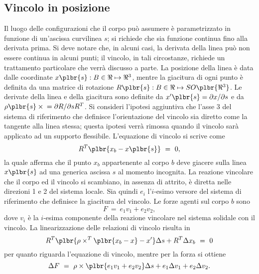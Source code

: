 \documentclass[12pt,dvips,fleqn,italian]{article}
\begin{document}
\subsection*{Vincolo in posizione}
Il luogo delle configurazioni che il corpo pu\`{o} assumere \`{e}
parametrizzato in funzione di un'ascissa curvilinea $ s $; 
si richiede che sia funzione continua fino alla derivata prima.
Si deve notare che, in alcuni casi, la derivata della linea pu\`o 
non essere continua in alcuni punti; il vincolo, in tali circostanze, 
richiede un trattamento particolare che verr\`a discusso a parte.
La posizione della linea \`{e} data dalle coordinate 
$ x\plbr{s}:B\in\Re\mapsto\Re^3 $,
mentre la giacitura di ogni punto \`{e} definita da una matrice di rotazione
$ R\plbr{s}:B\in\Re\mapsto{SO\plbr{\Re^3}} $.
Le derivate della linea e della giacitura sono definite da
$ x'\plbr{s}=\partial{x}/\partial{s} $ e da
$ \rho\plbr{s}\times{}=\partial{R}/\partial{s}R^T $.
Si consideri l'ipotesi aggiuntiva che l'asse 3 del sistema di riferimento
che definisce l'orientazione del vincolo sia diretto come la tangente alla
linea stessa; questa ipotesi verr\`a rimossa quando il vincolo sar\`a
applicato ad un supporto flessibile.
L'equazione di vincolo si scrive come
\begin{displaymath}
    R^T \plbr{ x_b - x\plbr{s} } \ = \ 0 ,
\end{displaymath}
la quale afferma che il punto $ x_b $ appartenente al corpo $ b $ deve
giacere sulla linea $ x\plbr{s} $ ad una generica ascissa $ s $ al momento
incognita.
La reazione vincolare che il corpo ed il vincolo si scambiano, in assenza di
attrito, \`{e} diretta nelle direzioni 1 e 2 del sistema locale.
Sia quindi $ e_i $ l'$i$-esimo versore del sistema di riferimento che
definisce la giacitura del vincolo.
Le forze agenti sul corpo $ b $ sono
\begin{displaymath}
    F \ = \ e_1 v_1 + e_2 v_2 ,
\end{displaymath}
dove $ v_i $ \`{e} la $i$-esima componente della reazione vincolare nel
sistema solidale con il vincolo.
La linearizzazione delle relazioni di vincolo risulta in
\begin{displaymath}
    R^T \plbr{ \rho \times^T \plbr{ x_b - x } - x' }\Delta{s}
    + R^T \Delta{x_b} \ = \ 0
\end{displaymath}
per quanto riguarda l'equazione di vincolo, mentre per la forza si ottiene
\begin{displaymath}
    \Delta{F} \ = \ 
        \rho \times \plbr{ e_1 v_1 + e_2 v_2 } \Delta{s}
	+ e_1 \Delta{v_1} + e_2 \Delta{v_2} .
\end{displaymath}
\end{document}
